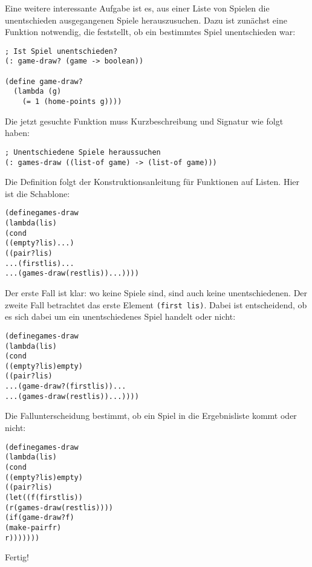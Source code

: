 Eine weitere interessante Aufgabe ist es, aus einer Liste von Spielen die
unentschieden ausgegangenen Spiele herauszusuchen. Dazu ist zunächst eine
Funktion notwendig, die feststellt, ob ein bestimmtes Spiel unentschieden war:
\begin{verbatim}
; Ist Spiel unentschieden?
(: game-draw? (game -> boolean))

(define game-draw?
  (lambda (g)
    (= 1 (home-points g))))
\end{verbatim}
Die jetzt gesuchte Funktion muss Kurzbeschreibung und Signatur wie folgt haben:
\begin{verbatim}
; Unentschiedene Spiele heraussuchen
(: games-draw ((list-of game) -> (list-of game)))
\end{verbatim}
%
Die Definition folgt der Konstruktionsanleitung für Funktionen auf Listen.
Hier ist die Schablone:
%
\begin{alltt}
(define games-draw
  (lambda (lis)
    (cond
      ((empty? lis) ...)
      ((pair? lis)
       ... (first lis) ...
       ... (games-draw (rest lis)) ...))))
\end{alltt}
%
Der erste Fall ist klar: wo keine Spiele sind, sind auch keine
unentschiedenen.  Der zweite Fall betrachtet das erste Element \texttt{(first
  lis)}.  Dabei ist entscheidend, ob es sich dabei um ein unentschiedenes Spiel
handelt oder nicht:
%
\begin{alltt}
(define games-draw
  (lambda (lis)
    (cond
      ((empty? lis) empty)
      ((pair? lis)
       ... (game-draw? (first lis)) ...
       ... (games-draw (rest lis)) ...))))
\end{alltt}
%
Die Fallunterscheidung bestimmt, ob ein Spiel in die Ergebnisliste kommt oder
nicht:
%
\begin{alltt}
(define games-draw
  (lambda (lis)
    (cond
      ((empty? lis) empty)
      ((pair? lis)
       (let ((f (first lis))
             (r (games-draw (rest lis))))
       (if (game-draw? f)
           (make-pair f r)
           r)))))))
\end{alltt}
%
Fertig!

